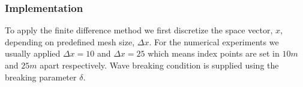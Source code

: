 \subsubsection{Implementation}
To apply the finite difference method we first discretize the space vector, ${x}$, depending on predefined mesh size, ${\Delta x}$. For the numerical experiments we usually applied $\Delta x=10$ and ${\Delta x=25}$ which means index points are set in ${10m}$ and ${25m}$ apart respectively. Wave breaking condition is supplied using the breaking parameter ${\delta}$.

